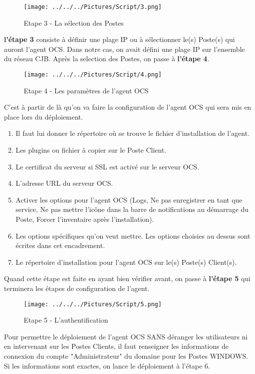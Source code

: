 \documentclass[11pt,a4paper,oneside]{article}
\begin{document}
\begin{figure}[hbtp]
 \centering
 \texttt{[image: ../../../Pictures/Script/3.png]}
 \caption{Etape 3 - La sélection des Postes}
 \end{figure}
  
\textbf{l'étape 3} consiste à définir une plage IP  ou à sélectionner le(s) Poste(s) qui auront l'agent OCS. Dans notre cas, on avait défini une plage IP sur l'ensemble du réseau CJB. Après la selection des Postes, on passe à \textbf{l'étape 4}.
\newpage

\begin{figure}[hbtp]
\centering
\texttt{[image: ../../../Pictures/Script/4.png]}
\caption{Etape 4 - Les paramètres de l'agent OCS}
\end{figure}

C'est à partir de là qu'on va faire la configuration de l'agent OCS qui sera mis en place lors du déploiement.  
\begin{enumerate}
\item Il faut lui donner le répertoire où se trouve le fichier d'installation de l'agent.
\item Les plugins ou fichier à copier sur le Poste Client.
\item Le certificat du serveur si SSL est activé sur le serveur OCS.
\item L'adresse URL du serveur OCS.
\item Activer les options pour l'agent OCS (Logs, Ne pas enregistrer en tant que service, Ne pas mettre l'icône dans la barre de notifications au démarrage du Poste, Forcer l'inventaire après l'installation).
\item Les options spécifiques qu'on veut mettre. Les options choisies au dessus sont écrites dans cet encadrement.
\item Le répertoire d'installation pour l'agent OCS sur le(s) Poste(s) Client(s).
\end{enumerate}
Quand cette étape est faite en ayant bien vérifier avant, on passe à \textbf{l'étape 5} qui terminera les étapes de configuration de l'agent.
\newpage
\begin{figure}[hbtp]
\centering
\texttt{[image: ../../../Pictures/Script/5.png]}
\caption{Etape 5 - L'authentification}
\end{figure}

Pour permettre le déploiement de l'agent OCS SANS déranger les utilisateurs ni en intervenant sur les Postes Clients, il faut renseigner les informations de connexion du compte "Administrateur" du domaine pour les Postes WINDOWS. Si les informations sont exactes, on lance le déploiement à l'étape 6.
\end{document}
